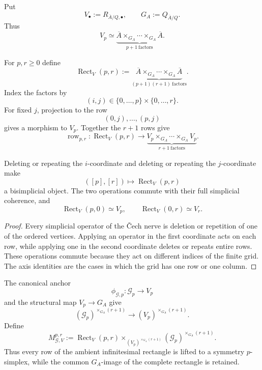 Put
\[
V_\bullet:=R_{\overline A/Q,\bullet},
\qquad
G_A:=Q_{\overline A/Q}.
\]
Thus
\[
V_p\simeq
\underbrace{
\overline A\times_{G_A}\cdots\times_{G_A}\overline A
}_{p+1\ \mathrm{factors}}.
\]

\begin{construction}
\label{constr:symmetry-noether-ambient-rectangular-relation-grid}
For $p,r\ge0$ define
\[
\boxed{
\operatorname{Rect}_V(p,r)
:=
\underbrace{
\overline A\times_{G_A}\cdots\times_{G_A}\overline A
}_{(p+1)(r+1)\ \mathrm{factors}}.
}
\]
Index the factors by
\[
(i,j)\in\{0,\ldots,p\}\times\{0,\ldots,r\}.
\]
For fixed $j$, projection to the row
\[
(0,j),\ldots,(p,j)
\]
gives a morphism to $V_p$.  Together the $r+1$ rows give
\[
\operatorname{row}_{p,r}:
\operatorname{Rect}_V(p,r)
\longrightarrow
\underbrace{
V_p\times_{G_A}\cdots\times_{G_A}V_p
}_{r+1\ \mathrm{factors}}.
\]
\end{construction}

\begin{lemma}
\label{lem:symmetry-noether-rectangular-functoriality}
Deleting or repeating the $i$-coordinate and deleting or repeating the $j$-coordinate
make
\[
([p],[r])\longmapsto\operatorname{Rect}_V(p,r)
\]
a bisimplicial object.  The two operations commute with their full simplicial
coherence, and
\[
\operatorname{Rect}_V(p,0)\simeq V_p,
\qquad
\operatorname{Rect}_V(0,r)\simeq V_r.
\]
\end{lemma}

\begin{proof}
Every simplicial operator of the \v{C}ech nerve is deletion or repetition of one
of the ordered vertices.  Applying an operator in the first coordinate acts on
each row, while applying one in the second coordinate deletes or repeats entire
rows.  These operations commute because they act on different indices of the
finite grid.  The axis identities are the cases in which the grid has one row or
one column.
\end{proof}

\begin{definition}
\label{def:symmetry-noether-symmetry-vertical-mixed-grid}
The canonical anchor
\[
\phi_{\mathcal G,p}:\mathcal G_p\longrightarrow V_p
\]
and the structural map $V_p\to G_A$ give
\[
(\mathcal G_p)^{\times_{G_A}(r+1)}
\longrightarrow
(V_p)^{\times_{G_A}(r+1)}.
\]
Define
\[
\boxed{
M_{\mathcal G,V}^{p,r}
:=
\operatorname{Rect}_V(p,r)
\times_{(V_p)^{\times_{G_A}(r+1)}}
(\mathcal G_p)^{\times_{G_A}(r+1)}.
}
\]
Thus every row of the ambient infinitesimal rectangle is lifted to a symmetry
$p$-simplex, while the common $G_A$-image of the complete rectangle is retained.
\end{definition}

